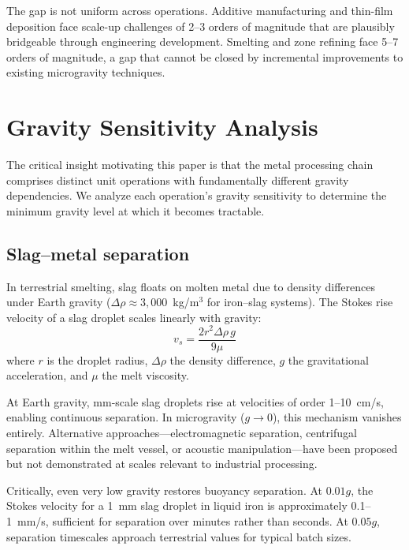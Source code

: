 \documentclass[preprint,12pt]{elsarticle}
\begin{document}
The gap is not uniform across operations. Additive manufacturing and thin-film deposition face scale-up challenges of 2--3 orders of magnitude that are plausibly bridgeable through engineering development. Smelting and zone refining face 5--7 orders of magnitude, a gap that cannot be closed by incremental improvements to existing microgravity techniques.

\section{Gravity Sensitivity Analysis}
\label{sec:gravity-sensitivity}

The critical insight motivating this paper is that the metal processing chain comprises distinct unit operations with fundamentally different gravity dependencies. We analyze each operation's gravity sensitivity to determine the minimum gravity level at which it becomes tractable.

\subsection{Slag--metal separation}

In terrestrial smelting, slag floats on molten metal due to density differences under Earth gravity ($\Delta\rho \approx 3{,}000$~kg/m$^3$ for iron--slag systems). The Stokes rise velocity of a slag droplet scales linearly with gravity:
\begin{equation}
    v_s = \frac{2 r^2 \Delta\rho\, g}{9 \mu}
    \label{eq:stokes}
\end{equation}
where $r$ is the droplet radius, $\Delta\rho$ the density difference, $g$ the gravitational acceleration, and $\mu$ the melt viscosity.

At Earth gravity, mm-scale slag droplets rise at velocities of order 1--10~cm/s, enabling continuous separation. In microgravity ($g \to 0$), this mechanism vanishes entirely. Alternative approaches---electromagnetic separation, centrifugal separation within the melt vessel, or acoustic manipulation---have been proposed but not demonstrated at scales relevant to industrial processing.

Critically, even very low gravity restores buoyancy separation. At $0.01g$, the Stokes velocity for a 1~mm slag droplet in liquid iron is approximately 0.1--1~mm/s, sufficient for separation over minutes rather than seconds. At $0.05g$, separation timescales approach terrestrial values for typical batch sizes.
\end{document}
